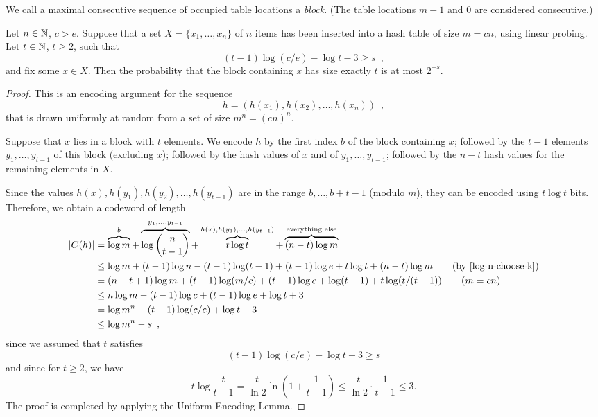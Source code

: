 \documentclass[format=acmsmall, review=false, screen=true]{acmart}
\begin{document}
We call a maximal consecutive sequence of occupied table locations a
\emph{block}. (The table locations $m-1$ and $0$ are considered
consecutive.)

\begin{thm}
  Let $n \in \mathbb{N}$, $c > e$.
  Suppose that a set $X = \{x_1, \dots, x_n\}$ of $n$ items 
  has been inserted into a hash table of size $m = cn$, using linear 
  probing.
  Let $t \in \mathbb{N}$, $t \geq 2$, such that
  \[
    (t-1) \log (c/e) - \log t - 3 \ge s \enspace ,
  \]
  and fix some $x\in X$. 
  Then the probability that the block containing
  $x$ has size exactly $t$
  is at most $2^{-s}$.
\end{thm}

\begin{proof}
  This is an encoding argument for 
  the sequence
  \[
    h = (h(x_1),h(x_2),\ldots,h(x_n)) \enspace ,
  \]
  that is drawn uniformly at random from a set of size
  $m^n = (cn)^n$.
  
  Suppose that $x$ lies in a block with $t$ elements.
  We encode $h$ by the first index $b$ of the block containing $x$;
  followed by the $t-1$ elements $y_1,\dots,y_{t-1}$ of this block
  (excluding $x$); followed by the hash
  values of $x$ and of $y_1,\dots,y_{t-1}$; followed by
  the $n-t$ hash values for the remaining elements in $X$.

  Since the values $h(x),h(y_1),h(y_2),\ldots,h(y_{t-1})$ are in the range
  $b,\ldots,b+t-1$ (modulo $m$), they can be encoded using
  $t\log t$ bits.  Therefore, 
  we obtain a codeword of length 
  \begin{align*}
    |C(h)| & = \overbrace{\log m}^{b} + \overbrace{\log\binom{n}{t-1}}^{y_1,\ldots,y_{t-1}} + \overbrace{t\log t}^{h(x),h(y_1),\ldots,h(y_{t-1})} + \overbrace{(n-t)\log m}^{\text{everything else}} \\
           & \le \log m + (t-1)\log n - 
             (t-1)\log(t-1) + (t-1)\log e + t\log t + (n-t)\log m \tag{by \eqref{log-n-choose-k}}\\
	  &=
         (n-t+1)\log m + (t-1)\log (m/c) + (t-1)\log e + \log (t-1)+ t\log(t/(t-1)) \tag{$m = cn$}\\
           & \leq n\log m - (t-1)\log c + (t-1)\log e + \log t + 3 \\
           & = \log m^n - (t-1)\log(c/e) + \log t + 3 \\
           & \le \log m^n - s \enspace ,
  \end{align*}
  since we assumed that $t$ satisfies
  \[
    (t-1) \log (c/e) - \log t - 3 \ge s 
  \]
  and since for $t \geq 2$, we have
  \[
   t\log\frac{t}{t-1} = \frac{t}{\ln 2} \ln 
   \left(1 + \frac{1}{t-1}\right) 
   \leq \frac{t}{\ln 2} \cdot \frac{1}{t-1}
   \leq 3.
  \]
  The proof is completed by applying the Uniform Encoding Lemma.
\end{proof}
\end{document}
